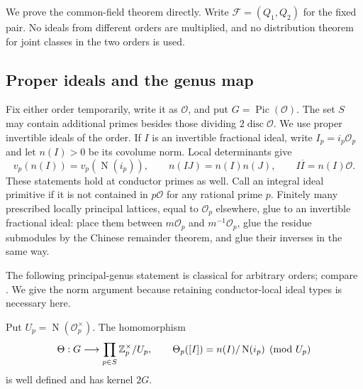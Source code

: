 We prove the common-field theorem directly. Write
\(\mathcal F=(Q_1,Q_2)\) for the fixed pair.
No ideals from different orders are multiplied, and no distribution
theorem for joint classes in the two orders is used.

\subsection{Proper ideals and the genus map}

Fix either order temporarily, write it as \(\mathcal O\), and put
\(G=\operatorname{Pic}(\mathcal O)\). The set \(S\) may contain
additional primes besides those dividing \(2\operatorname{disc}\mathcal O\).
We use proper invertible ideals of the order.  If $I$ is an invertible
fractional ideal, write $I_p=i_p\mathcal O_p$ and let $n(I)>0$ be its
covolume norm.  Local determinants give
\begin{equation}\label{eq:norm-ideal-identities}
 v_p(n(I))=v_p(\operatorname N(i_p)),\qquad
 n(IJ)=n(I)n(J),\qquad I\overline I=n(I)\mathcal O.
\end{equation}
These statements hold at conductor primes as well.  Call an integral
ideal primitive if it is not contained in $p\mathcal O$ for any rational
prime $p$.  Finitely many prescribed locally principal lattices, equal
to $\mathcal O_p$ elsewhere, glue to an invertible fractional ideal:
place them between $m\mathcal O_p$ and $m^{-1}\mathcal O_p$, glue the
residue submodules by the Chinese remainder theorem, and glue their
inverses in the same way.

The following principal-genus statement is classical for arbitrary
orders; compare \cite[Appendix~A, Proposition~A.1]{khayutin}.  We give
the norm argument because retaining conductor-local ideal types is
necessary here.

\begin{lemma}\label{lem:norm-genus}
Put $U_p=\operatorname N(\mathcal O_p^\times)$.  The homomorphism
\[
 \Theta:G\longrightarrow
       \prod_{p\in S}\mathbb Z_p^\times/U_p,\qquad
 \Theta_p([I])=n(I)/\operatorname N(i_p)\pmod{U_p}
\]
is well defined and has kernel $2G$.
\end{lemma}

